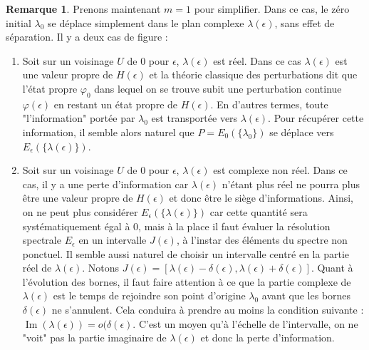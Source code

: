 \documentclass[12pt,openany,a4paper, titlepage]{article}
\newcommand{\lp}{\left(}
\newcommand{\rp}{\right)}
\newcommand{\vp}{\varphi}
\newcommand{\im}{\operatorname{Im}}
\theoremstyle{definition}
\theoremstyle{definition}
\theoremstyle{definition}
\theoremstyle{definition}
\theoremstyle{definition}
\newtheorem{rem}{Remarque}
\theoremstyle{definition}
\begin{document}
\begin{rem}
Prenons maintenant $m = 1$ pour simplifier. Dans ce cas, le zéro initial $\lambda_0$ se déplace simplement dans le plan complexe $\lambda(\epsilon)$, sans effet de séparation.  Il y a deux cas de figure :
\begin{enumerate}
    \item Soit sur un voisinage $U$ de $0$ pour $\epsilon$,  $\lambda(\epsilon)$ est réel. Dans ce cas $\lambda(\epsilon)$ est une valeur propre de $H(\epsilon)$ et la théorie classique des perturbations dit que l'état propre $\vp_0$ dans lequel on se trouve subit une perturbation continue $\vp(\epsilon)$ en restant un état propre de $H(\epsilon)$. En d'autres termes,  
    toute "l'information" portée par $\lambda_0$ est transportée vers $\lambda(\epsilon)$. Pour récupérer cette information, il semble alors naturel que $P=E_0\lp\{\lambda_0\}\rp$ se déplace vers $E_\epsilon\lp\{\lambda(\epsilon)\}\rp$.  
    \item Soit sur un voisinage $U$ de $0$ pour $\epsilon$, $\lambda(\epsilon)$ est complexe non réel. Dans ce cas, il y a une perte d'information car $\lambda(\epsilon)$ n'étant plus réel ne pourra plus être une valeur propre de $H(\epsilon)$ et donc être le siège d'informations. Ainsi, on ne peut plus considérer $E_\epsilon\lp\{\lambda(\epsilon)\}\rp$ car cette quantité sera systématiquement égal à $0$, mais à la place il faut évaluer la résolution spectrale $E_\epsilon$ en un intervalle $J(\epsilon)$, à l'instar des éléments du spectre non ponctuel. Il semble aussi naturel de choisir un intervalle centré en la partie réel de $\lambda(\epsilon)$. Notons $J(\epsilon) = [\lambda(\epsilon)-\delta(\epsilon),\lambda(\epsilon)+\delta(\epsilon)]$. Quant à l'évolution des bornes, il faut faire attention à ce que la partie complexe de $\lambda(\epsilon)$ est le temps de rejoindre son point d'origine $\lambda_0$ avant que les bornes $\delta(\epsilon)$ ne s'annulent. Cela conduira à prendre au moins la condition suivante : $\im(\lambda(\epsilon)) = o(\delta(\epsilon)$. C'est un moyen qu'à l'échelle de l'intervalle, on ne "voit" pas la partie imaginaire de $\lambda(\epsilon)$ et donc la perte d'information.
\end{enumerate}




\end{rem}
\end{document}
